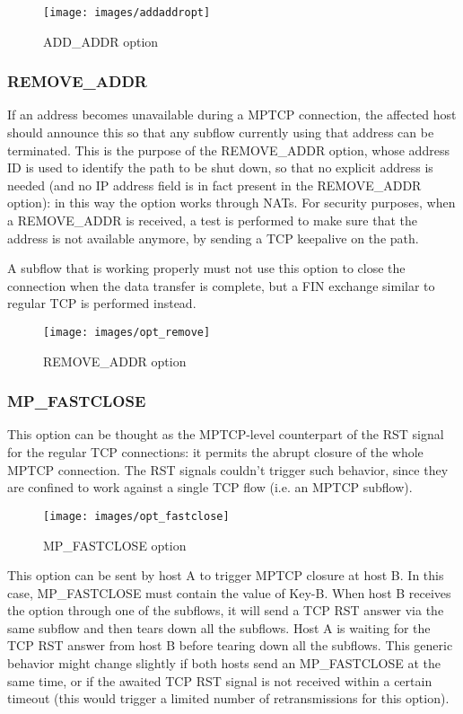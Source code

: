 \begin{figure}[!htb]
\centering
\texttt{[image: images/addaddropt]}
\caption{ADD\_ADDR option}
\label{fig:addaddropt}
\end{figure}

\subsubsection{REMOVE\_ADDR}
If an address becomes unavailable during a MPTCP connection, the affected host should announce this so that any subflow currently using that address can be terminated. This is the purpose of the REMOVE\_ADDR option, whose address ID is used to identify the path to be shut down, so that no explicit address is needed (and no IP address field is in fact present in the REMOVE\_ADDR option): in this way the option works through NATs. For security purposes, when a REMOVE\_ADDR is received, a test is performed to make sure that the address is not available anymore, by sending a TCP keepalive on the path.

A subflow that is working properly must not use this option to close the connection when the data transfer is complete, but a FIN exchange similar to regular TCP is performed instead.

\begin{figure}[!htb]
\centering
\texttt{[image: images/opt\_remove]}
\caption{REMOVE\_ADDR option}
\label{fig:opt_remove}
\end{figure}

\subsubsection{MP\_FASTCLOSE}
This option can be thought as the MPTCP-level counterpart of the RST signal for the regular TCP connections: it permits the abrupt closure of the whole MPTCP connection. The RST signals couldn't trigger such behavior, since they are confined to work against a single TCP flow (i.e. an MPTCP subflow).

\begin{figure}[!htb]
\centering
\texttt{[image: images/opt\_fastclose]}
\caption{MP\_FASTCLOSE option}
\label{fig:opt_fastclose}
\end{figure}

This option can be sent by host A to trigger MPTCP closure at host B. In this case, MP\_FASTCLOSE must contain the value of Key-B. When host B receives the option through one of the subflows, it will send a TCP RST answer via the same subflow and then tears down all the subflows. Host A is waiting for the TCP RST answer from host B before tearing down all the subflows. This generic behavior might change slightly if both hosts send an MP\_FASTCLOSE at the same time, or if the awaited TCP RST signal is not received within a certain timeout (this would trigger a limited number of retransmissions for this option).


